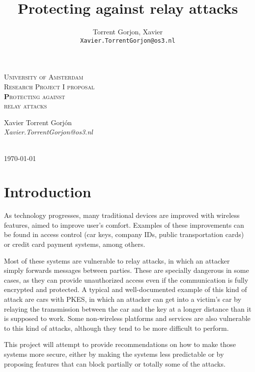 \documentclass{article}
\author{
  Torrent Gorjon, Xavier\\
  \texttt{Xavier.TorrentGorjon@os3.nl}
}
\title{Protecting against relay attacks}
\begin{document}
\begin{titlepage}
\center

\textsc{\LARGE University of Amsterdam}\\[1.5cm]

\textsc{\Large Research Project I proposal}\\[0.5cm]

\textsc{\Huge \textbf Protecting against\\relay attacks}\\[1.5cm]


\begin{minipage}{0.5 \textwidth}
\begin{center} \large
Xavier Torrent Gorj\'{o}n\\
\emph{Xavier.TorrentGorjon@os3.nl}\\[0.5cm]
\end{center}
\end{minipage}\\[3cm]
{\large \today} 


\end{titlepage}


\newpage

\tableofcontents
\section{Introduction}
As technology progresses, many traditional devices are improved with wireless features, aimed to improve user's comfort. Examples of these improvements can be found in access control (car keys, company IDs, public transportation cards) or credit card payment systems, among others.

Most of these systems are vulnerable to relay attacks, in which an attacker simply forwards messages between parties. These are specially dangerous in some cases, as they can provide unauthorized access even if the communication is fully encrypted and protected. A typical and well-documented example of this kind of attack are cars with PKES, in which an attacker can get into a victim's car by relaying the transmission between the car and the key at a longer distance than it is supposed to work. Some non-wireless platforms and services are also vulnerable to this kind of attacks, although they tend to be more difficult to perform.

This project will attempt to provide recommendations on how to make those systems more secure, either by making the systems less predictable or by proposing features that can block partially or totally some of the attacks.
\end{document}
